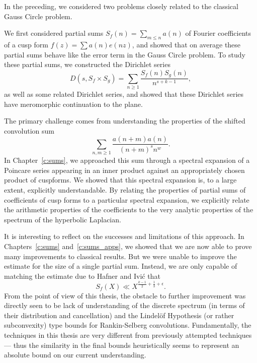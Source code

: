 

In the preceding, we considered two problems closely related to the classical Gauss
Circle problem.


We first considered partial sums $S_f(n) = \sum_{m \leq n} a(n)$ of Fourier coefficients
of a cusp form $f(z) = \sum a(n) e(nz)$, and showed that on average these partial sums
behave like the error term in the Gauss Circle problem.
To study these partial sums, we constructed the Dirichlet series
\begin{equation}
  D(s, S_f \times S_g) = \sum_{n \geq 1} \frac{S_f(n) S_g(n)}{n^{s + k - 1}},
\end{equation}
as well as some related Dirichlet series, and showed that these Dirichlet series have
meromorphic continuation to the plane.


The primary challenge comes from understanding the properties of the shifted convolution
sum
\begin{equation}
  \sum_{n,m \geq 1} \frac{a(n+m) a(n)}{(n+m)^s n^w}.
\end{equation}
In Chapter~\ref{c:sums}, we approached this sum through a spectral expansion of a Poincare
series appearing in an inner product against an appropriately chosen product of cuspforms.
We showed that this spectral expansion is, to a large extent, explicitly understandable.
By relating the properties of partial sums of coefficients of cusp forms to a particular
spectral expansion, we explicitly relate the arithmetic properties of the coefficients to
the very analytic properties of the spectrum of the hyperbolic Laplacian.


It is interesting to reflect on the successes and limitations of this approach.
In Chapters~\ref{c:sums} and~\ref{c:sums_apps}, we showed that we are now able to prove
many improvements to classical results.
But we were unable to improve the estimate for the size of a single partial sum.
Instead, we are only capable of matching the estimate due to Hafner and Ivi\'c that
\begin{equation}
  S_f(X) \ll X^{\frac{k-1}{2} + \frac{1}{3} + \epsilon}.
\end{equation}
From the point of view of this thesis, the obstacle to further improvement was directly
seen to be lack of understanding of the discrete spectrum (in terms of their distribution
and cancellation) and the Lindel\"{o}f Hypothesis (or rather subconvexity) type bounds for
Rankin-Selberg convolutions.
Fundamentally, the techniques in this thesis are very different from previously attempted
techniques --- thus the similarity in the final bounds heuristically seems to represent an
absolute bound on our current understanding.





